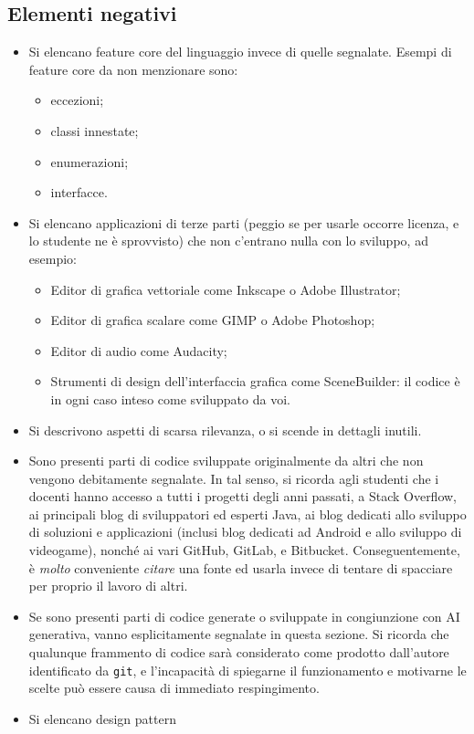\documentclass[a4paper,12pt]{report}
\begin{document}
\subsection*{Elementi negativi}
\begin{itemize}
	\item Si elencano feature core del linguaggio invece di quelle segnalate. Esempi di feature core da non menzionare sono:
    \begin{itemize}
        \item eccezioni;
        \item classi innestate;
        \item enumerazioni;
        \item interfacce.
    \end{itemize}
	\item Si elencano applicazioni di terze parti (peggio se per usarle occorre licenza, e lo studente ne è sprovvisto) che non c'entrano nulla con lo sviluppo, ad esempio:
    \begin{itemize}
        \item Editor di grafica vettoriale come Inkscape o Adobe Illustrator;
        \item Editor di grafica scalare come GIMP o Adobe Photoshop;
        \item Editor di audio come Audacity;
        \item Strumenti di design dell'interfaccia grafica come SceneBuilder: il codice è in ogni caso inteso come sviluppato da voi.
    \end{itemize}
	\item Si descrivono aspetti di scarsa rilevanza, o si scende in dettagli inutili.
	\item Sono presenti parti di codice sviluppate originalmente da altri che non vengono debitamente segnalate.
	In tal senso, si ricorda agli studenti che i docenti hanno accesso a tutti i progetti degli anni passati,
	a Stack Overflow,
	ai principali blog di sviluppatori ed esperti Java,
	ai blog dedicati allo sviluppo di soluzioni e applicazioni
	(inclusi blog dedicati ad Android e allo sviluppo di videogame),
	nonché ai vari GitHub, GitLab, e Bitbucket.
	Conseguentemente, è \emph{molto} conveniente \emph{citare} una fonte ed usarla invece di tentare di spacciare per proprio il lavoro di altri.
	\item Se sono presenti parti di codice generate o sviluppate in congiunzione con AI generativa,
	vanno esplicitamente segnalate in questa sezione.
	Si ricorda che qualunque frammento di codice sarà considerato come prodotto dall'autore identificato da \texttt{git},
	e l'incapacità di spiegarne il funzionamento e motivarne le scelte può essere causa di immediato respingimento.
	\item Si elencano design pattern
\end{itemize}
\end{document}
